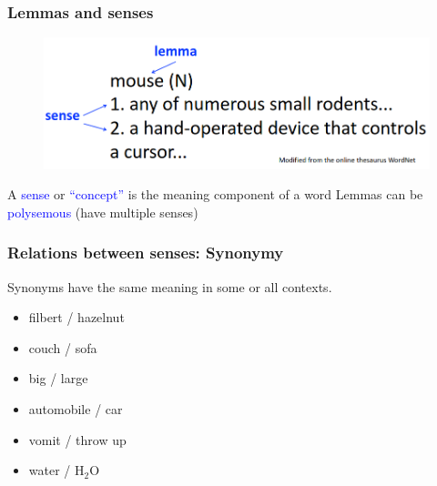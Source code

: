 \documentclass[13.5pt,aspecratio=169, xcolor=dvipsnames]{beamer}
\begin{document}
    
    \begin{frame}
        \onehalfspacing
            \frametitle{Lemmas and senses}
                \begin{figure}[h]
                    \centering
                    \includegraphics[width=\linewidth]{sense.png}
                \end{figure}
                
                {\large
                A \textcolor{blue}{sense} or \textcolor{blue}{“concept”} is the meaning component of a word
Lemmas can be \textcolor{blue}{polysemous} (have multiple senses) }
        \end{frame}
    
    

\begin{frame}
\onehalfspacing
    \frametitle{Relations between senses: Synonymy}
    {\large
    Synonyms have the same meaning in some or all
contexts.

    \bigskip
    \begin{minipage}{0.45\textwidth}
    \begin{itemize}
        \item filbert / hazelnut
        \item couch / sofa
        \item big / large
    \end{itemize} 
    \end{minipage}
    \begin{minipage}{0.45\textwidth}
        \begin{itemize}
            \item automobile / car
            \item vomit / throw up
            \item water / $ \mathrm{H_2 O} $
        \end{itemize} 
    \end{minipage}
    
    }

\end{frame}
\end{document}
